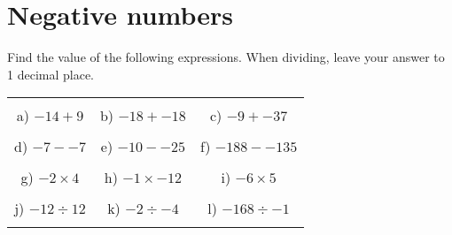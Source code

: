 \documentclass[12pt]{article}
\begin{document}
\pagestyle{fancy}
\fancyfoot{} 
\section{Negative numbers}
Find the value of the following expressions. When dividing, leave your answer to 1 decimal place.
\begin{table}[h!]
\centering
\begin{tabular}{c c c}
\hspace{5cm} & \hspace{5cm} & \hspace{5cm} \\
a) ${-14} + {9}$ & b) ${-18} + {-18}$ & c) ${-9} + {-37}$ \\ \\
d) ${-7} - {-7}$ & e) ${-10} - {-25}$ & f) ${-188} - {-135}$ \\ \\
g) ${-2}\times{4}$ & h) ${-1}\times{-12}$ & i) ${-6}\times{5}$ \\ \\
j) ${-12}\div{12}$ & k) ${-2}\div{-4}$ & l) ${-168}\div{-1}$ \\ \\
\end{tabular}
\end{table}
\newline
\end{document}
